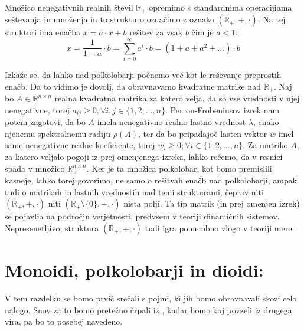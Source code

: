 \documentclass[mat1]{fmfdelo}
\newcommand{\R}{\mathbb{R}}
\newcommand{\Pplus}[1]{\mathbb{#1}_{+}}
\begin{document}
\begin{zgled}
	Množico nenegativnih realnih števil $\Pplus{R}$ opremimo s standardnima operacijiama seštevanja in množenja in to strukturo označimo z oznako $(\Pplus{R}, +, \cdot)$. Na tej strukturi ima enačba $x = a\cdot x + b$ rešitev za vsak $b$ čim je $a < 1$: $$ x = \frac{1}{1 - a} \cdot b = \sum_{i = 0}^{\infty}a^i \cdot b = (1 + a + a^2 + \ldots)\cdot b$$
\end{zgled}

Izkaže se, da lahko nad polkolobarji počnemo več kot le reševanje preprostih enačb. Da to vidimo je dovolj, da obravnavamo kvadratne matrike nad $\Pplus{R}$. Naj bo $A \in\R^{n\times n}$ realna kvadratna matrika za katero velja, da so vse vrednosti v njej nenegativne, torej $a_{ij} \geq 0, \forall i, j \in \{1, 2, \ldots, n\}$. Perron-Frobeniusov izrek nam potem zagotovi, da bo $A$ imela nenegativno realno lastno vrednost $\lambda$, enako njenemu spektralnemu radiju $\rho(A)$, ter da bo pripadajoč lasten vektor $w$ imel same nenegativne realne koeficiente, torej $w_i \geq 0; \forall i\in \{1, 2, \ldots, n\}$. 
Za matriko $A$, za katero veljalo pogoji iz prej omenjenega izreka, lahko rečemo, da v resnici spada v množico $\Pplus{R}^{n\times n}$. Ker je ta množica polkolobar, kot bomo premislili kasneje, lahko torej govorimo, ne samo o rešitvah enačb nad polkolobarji, ampak tudi o matrikah in lastnih vrednostih nad temi strukturami, čeprav niti $(\Pplus{R}, +, \cdot)$ niti $(\Pplus{R}\setminus\{0\}, +, \cdot)$ nista polji. Ta tip matrik (in prej omenjen izrek) se pojavlja na področju verjetnosti, predvsem v teoriji dinamičnih sistemov. Nepresenetljivo, struktura $(\Pplus{R}, +, \cdot)$ tudi igra pomembno vlogo v teoriji mere.

\section{Monoidi, polkolobarji in dioidi:}\label{sect:basicstructures}
V tem razdelku se bomo prvič srečali s pojmi, ki jih bomo obravnavali skozi celo nalogo. Snov za to bomo pretežno črpali iz \cite[Poglavje 1]{bib:Gondran}, kadar bomo kaj povzeli iz drugega vira, pa bo to posebej navedeno. 
\end{document}
